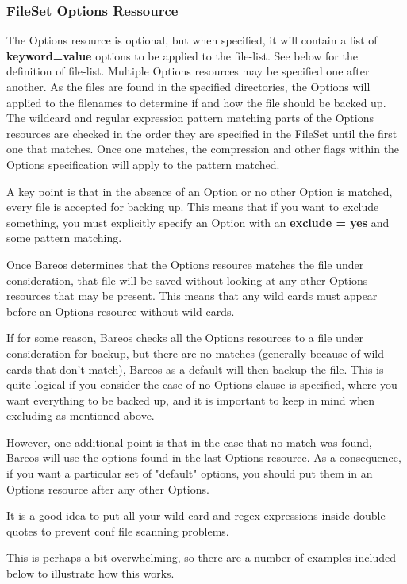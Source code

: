 \subsubsection{FileSet Options Ressource}
\label{fileset-options}

The Options resource is optional, but when specified, it will contain a
list of {\bf keyword=value} options to be applied to the file-list.
See below for the definition of file-list.
Multiple Options resources may be specified one after another.  As the
files are found in the specified directories, the Options will applied to
the filenames to determine if and how the file should be backed up.  The
wildcard and regular expression pattern matching parts of the
Options resources are checked in the order they are specified in the
FileSet until the first one that matches. Once one matches, the
compression and other flags within the Options specification will
apply to the pattern matched.

A key point is that in the absence of an Option or no other Option is
matched, every file is accepted for backing up. This means that if
you want to exclude something, you must explicitly specify an Option
with an {\bf exclude = yes} and some pattern matching.

Once Bareos determines that the Options resource matches the file under
consideration, that file will be saved without looking at any other Options
resources that may be present.  This means that any wild cards must appear
before an Options resource without wild cards.

If for some reason, Bareos checks all the Options resources to a file under
consideration for backup, but there are no matches (generally because of wild
cards that don't match), Bareos as a default will then backup the file.  This
is quite logical if you consider the case of no Options clause is specified,
where you want everything to be backed up, and it is important to keep in mind
when excluding as mentioned above.

However, one additional point is that in the case that no match was found,
Bareos will use the options found in the last Options resource.  As a
consequence, if you want a particular set of "default" options, you should put
them in an Options resource after any other Options.

It is a good idea to put all your wild-card and regex expressions inside
double quotes to prevent conf file scanning problems.

This is perhaps a bit overwhelming, so there are a number of examples included
below to illustrate how this works.

